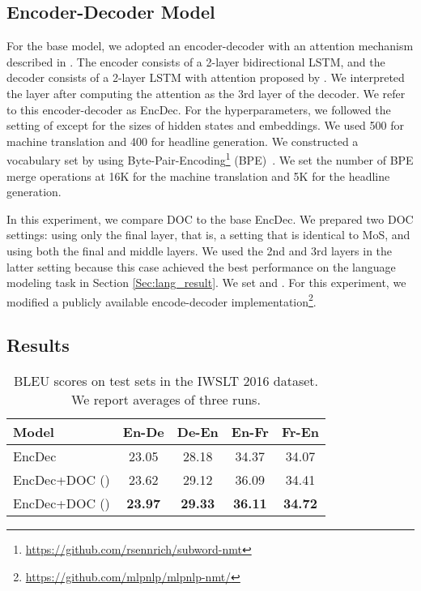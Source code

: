 \documentclass[11pt,a4paper]{article}
\begin{document}
\subsection{Encoder-Decoder Model}
For the base model, we adopted an encoder-decoder with an attention mechanism described in .
The encoder consists of a 2-layer bidirectional LSTM, and the decoder consists of a 2-layer LSTM with attention proposed by .
We interpreted the layer after computing the attention as the 3rd layer of the decoder.
We refer to this encoder-decoder as EncDec.
For the hyperparameters, we followed the setting of  except for the sizes of hidden states and embeddings.
We used 500 for machine translation and 400 for headline generation.
We constructed a vocabulary set by using Byte-Pair-Encoding\footnote{\href{https://github.com/rsennrich/subword-nmt}{https://github.com/rsennrich/subword-nmt}} (BPE)~\cite{sennrich-haddow-birch:2016:P16-11}.
We set the number of BPE merge operations at 16K for the machine translation and 5K for the headline generation.


In this experiment, we compare DOC to the base EncDec.
We prepared two DOC settings: using only the final layer, that is, a setting that is identical to MoS, and using both the final and middle layers.
We used the 2nd and 3rd layers in the latter setting because this case achieved the best performance on the language modeling task in Section \ref{Sec:lang_result}.
We set  and .
For this experiment, we modified a publicly available encode-decoder implementation\footnote{\href{https://github.com/mlpnlp/mlpnlp-nmt/}{https://github.com/mlpnlp/mlpnlp-nmt/}}.


\subsection{Results}

\begin{table}[!t]
  \centering
  \small
  \tabcolsep=2.5pt
  \begin{tabular}{| l | c c c c |} \hline
  Model & En-De & De-En & En-Fr & Fr-En\\ \hline
  EncDec & 23.05 & 28.18 & 34.37 & 34.07 \\
  EncDec+DOC () & 23.62 & 29.12 & 36.09 & 34.41 \\
  EncDec+DOC () & {\bf 23.97} & {\bf 29.33} & {\bf 36.11} & {\bf 34.72} \\ \hline
  \end{tabular}
  \caption{BLEU scores on test sets in the IWSLT 2016 dataset. We report averages of three runs.\label{tb:nmt}}
\end{table}
\end{document}
